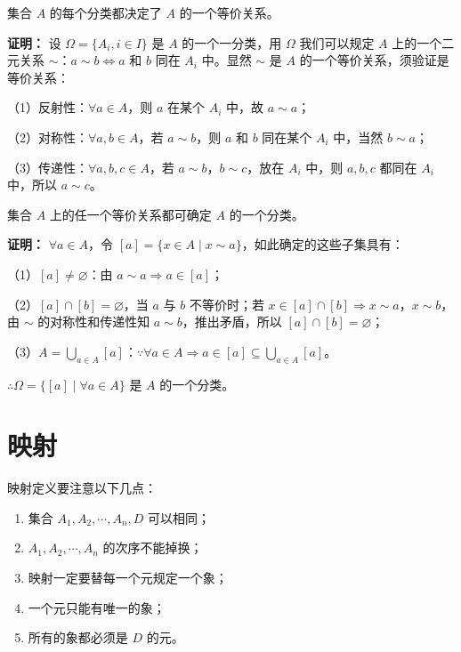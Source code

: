 \begin{theorem}[分类决定等价关系]
集合 $A$ 的每个分类都决定了 $A$ 的一个等价关系。

\textbf{证明：} 设 $\Omega=\{A_i,i\in I\}$ 是 $A$ 的一个一分类，用 $\Omega$ 我们可以规定 $A$ 上的一个二元关系 $\sim$：$a\sim b\Leftrightarrow a$ 和 $b$ 同在 $A_i$ 中。显然 $\sim$ 是 $A$ 的一个等价关系，须验证是等价关系：

（1）反射性：$\forall a\in A$，则 $a$ 在某个 $A_i$ 中，故 $a\sim a$；

（2）对称性：$\forall a,b\in A$，若 $a\sim b$，则 $a$ 和 $b$ 同在某个 $A_i$ 中，当然 $b\sim a$；

（3）传递性：$\forall a,b,c\in A$，若 $a\sim b$，$b\sim c$，放在 $A_i$ 中，则 $a,b,c$ 都同在 $A_i$ 中，所以 $a\sim c$。
\end{theorem}

\begin{theorem}[等价关系决定分类]
集合 $A$ 上的任一个等价关系都可确定 $A$ 的一个分类。

\textbf{证明：} $\forall a\in A$，令 $[a]=\{x\in A\mid x\sim a\}$，如此确定的这些子集具有：

（1）$[a]\ne\varnothing$：由 $a\sim a\Rightarrow a\in[a]$；

（2）$[a]\cap[b]=\varnothing$，当 $a$ 与 $b$ 不等价时；若 $x\in[a]\cap[b]\Rightarrow x\sim a$，$x\sim b$，由 $\sim$ 的对称性和传递性知 $a\sim b$，推出矛盾，所以 $[a]\cap[b]=\varnothing$；

（3）$A=\bigcup_{a\in A}[a]$：$\because\forall a\in A\Rightarrow a\in[a]\subseteq\bigcup_{a\in A}[a]$。

$\therefore\Omega=\{[a]\mid\forall a\in A\}$ 是 $A$ 的一个分类。
\end{theorem}

\section{映射}

\begin{definition}[映射]
映射定义要注意以下几点：
\begin{enumerate}
  \item 集合 $A_1,A_2,\cdots,A_n,D$ 可以相同；
  \item $A_1,A_2,\cdots,A_n$ 的次序不能掉换；
  \item 映射一定要替每一个元规定一个象；
  \item 一个元只能有唯一的象；
  \item 所有的象都必须是 $D$ 的元。
\end{enumerate}
\end{definition}


